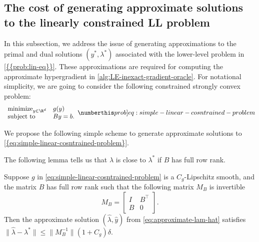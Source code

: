\subsection{The cost of generating approximate solutions to the linearly constrained LL problem}\label{sec:LEQ-cost-computing-ystar-lamstar}
In this subsection, we address the issue of generating approximations to the primal and dual solutions  $(y^*,\lambda^*)$ associated with the lower-level problem in \cref{{{prob:lin-eq}}}. These approximations are required for computing the approximate hypergradient in \cref{alg:LE-inexact-gradient-oracle}.  For notational simplicity, we are going to consider the following constrained strongly convex problem: 
\[ 
\begin{array}{ll}
    \mbox{minimize}_{y\in\R^d} &g(y)\\
    \mbox{subject to } & By=b.
\end{array}\numberthis\label[prob]{eq:simple-linear-cosntrained-problem}
\] 

We propose the following simple scheme to generate approximate solutions to \cref{{eq:simple-linear-cosntrained-problem}}. 
\begin{center}
\end{center}

The following lemma tells us that $\hat \lambda$ is close to $\lambda^*$ if $B$ has full row rank. 

\begin{lemma}\label{lm:generating-lamhat}
    Suppose $g$ in \cref{eq:simple-linear-cosntrained-problem} is a $C_g$-Lipschitz smooth, and the matrix $B$ has full row rank such that the following matrix $M_{B}$ is invertible
    $$M_B =\begin{bmatrix}
        I & B^\top\\
        B & 0
    \end{bmatrix}.$$
    Then the approximate solution $(\hat \lambda, \hat y)$ from \cref{eq:approximate-lam-hat} satisfies $\|\hat\lambda -\lambda^*\|\leq \|M_{B}^{-1}\| (1+C_g)\delta$.
\end{lemma}

